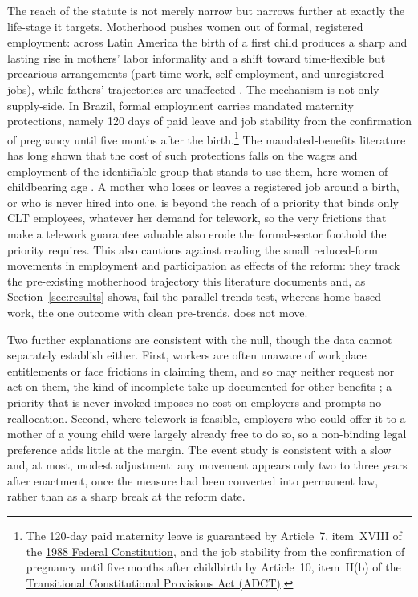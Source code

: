 \documentclass[12pt]{article}
\begin{document}
The reach of the statute is not merely narrow but narrows further at exactly the life-stage it targets. Motherhood pushes women out of formal, registered employment: across Latin America the birth of a first child produces a sharp and lasting rise in mothers' labor informality and a shift toward time-flexible but precarious arrangements (part-time work, self-employment, and unregistered jobs), while fathers' trajectories are unaffected \citep{berniell2021,berniell2023}. The mechanism is not only supply-side. In Brazil, formal employment carries mandated maternity protections, namely 120 days of paid leave and job stability from the confirmation of pregnancy until five months after the birth.\footnote{The 120-day paid maternity leave is guaranteed by Article~7, item~XVIII of the \href{https://www.planalto.gov.br/ccivil_03/constituicao/constituicao.htm}{1988 Federal Constitution}, and the job stability from the confirmation of pregnancy until five months after childbirth by Article~10, item~II(b) of the \href{https://www.planalto.gov.br/ccivil_03/constituicao/constituicao.htm\#adct}{Transitional Constitutional Provisions Act (ADCT)}.} The mandated-benefits literature has long shown that the cost of such protections falls on the wages and employment of the identifiable group that stands to use them, here women of childbearing age \citep{gruber1994,summers1989}. A mother who loses or leaves a registered job around a birth, or who is never hired into one, is beyond the reach of a priority that binds only CLT employees, whatever her demand for telework, so the very frictions that make a telework guarantee valuable also erode the formal-sector foothold the priority requires. This also cautions against reading the small reduced-form movements in employment and participation as effects of the reform: they track the pre-existing motherhood trajectory this literature documents and, as Section~\ref{sec:results} shows, fail the parallel-trends test, whereas home-based work, the one outcome with clean pre-trends, does not move.

Two further explanations are consistent with the null, though the data cannot separately establish either. First, workers are often unaware of workplace entitlements or face frictions in claiming them, and so may neither request nor act on them, the kind of incomplete take-up documented for other benefits \citep{bhargavamanoli2015,klevenkopczuk2011,finkelsteinnotowidigdo2019}; a priority that is never invoked imposes no cost on employers and prompts no reallocation. Second, where telework is feasible, employers who could offer it to a mother of a young child were largely already free to do so, so a non-binding legal preference adds little at the margin. The event study is consistent with a slow and, at most, modest adjustment: any movement appears only two to three years after enactment, once the measure had been converted into permanent law, rather than as a sharp break at the reform date.
\end{document}
